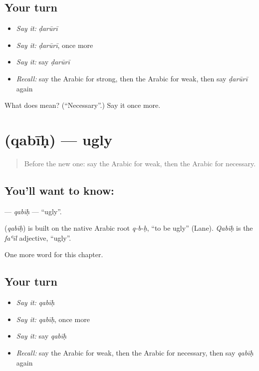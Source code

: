 \subsection*{Your turn}
\begin{itemize}
\raggedright
  \item \emph{Say it:} \emph{ḍarūrī}
  \item \emph{Say it:} \emph{ḍarūrī}, once more
  \item \emph{Say it:} say \emph{ḍarūrī}
  \item \emph{Recall:} say the Arabic for strong, then the Arabic for weak, then say \emph{ḍarūrī} again
\end{itemize}

\begin{tcolorbox}[breakable,colback=teal!4,colframe=teal!35!black,title={Before you move on}]
What does  mean? (\textquotedblleft{}Necessary\textquotedblright{}.) Say it once more.
\end{tcolorbox}
\section[\texorpdfstring{\ar{قبيح} (qabīḥ)}{قبيح (qabīḥ)}]{ (qabīḥ) — ugly}

\label{lesson:AR-C155-qabih}



\begin{quote}
Before the new one: say the Arabic for weak, then the Arabic for necessary.
\end{quote}

\subsection*{You'll want to know: }
\textbf{} — \emph{qabīḥ} — \textquotedblleft{}ugly\textquotedblright{}.

\begin{cousinweb}
\textbf{} (\emph{qabīḥ}) is built on the native Arabic root \emph{q-b-ḥ}, \textquotedblleft{}to be ugly\textquotedblright{} (Lane). \emph{Qabīḥ} is the \emph{faʿīl} adjective, \textquotedblleft{}ugly\textquotedblright{}.
\end{cousinweb}

\begin{grammarlens}[title={What you've built}]
One more word for this chapter.
\end{grammarlens}

\subsection*{Your turn}
\begin{itemize}
\raggedright
  \item \emph{Say it:} \emph{qabīḥ}
  \item \emph{Say it:} \emph{qabīḥ}, once more
  \item \emph{Say it:} say \emph{qabīḥ}
  \item \emph{Recall:} say the Arabic for weak, then the Arabic for necessary, then say \emph{qabīḥ} again
\end{itemize}

